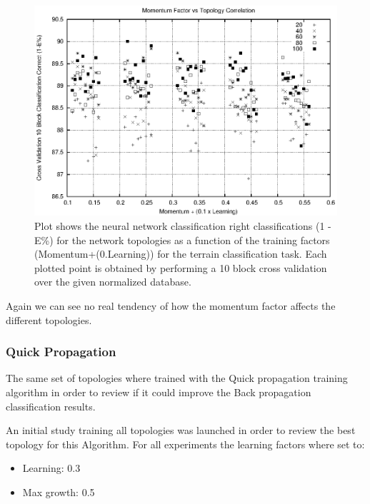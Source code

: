 \documentclass[a4paper,10pt,titlepage]{article}
\begin{document}
\begin{figure}[H]
	\centerline{%
	\includegraphics[]{momentum_topology.eps}
	}
	\caption[Terrain classification task: Correlation of the momentum factor over the topology]{Plot shows the neural network classification right classifications (1 - E\%) for the network topologies as a function of the training factors (Momentum+(0.Learning)) for the  terrain classification task. Each plotted point is obtained by performing a 10 block cross validation over the given normalized database.}
\end{figure}

\par Again we can see no real tendency of how the momentum factor affects the different topologies.

\subsubsection{Quick Propagation}

\par The same set of topologies where trained with the Quick propagation training algorithm in order to review if it could improve the Back propagation classification results.

\par An initial study training all topologies was launched in order to review the best topology for this Algorithm. For all experiments the learning factors where set to:
\begin{itemize}
	\item Learning: 0.3
	\item Max growth: 0.5
\end{itemize}
\end{document}
